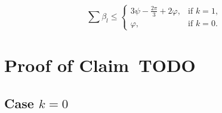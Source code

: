 
\begin{claim}
$$\sum{\beta_l}\leq\begin{cases}3\psi - \frac{2\pi}{3} + 2\varphi, & \textrm{if }k = 1, \\ \varphi, & \textrm{if }k = 0.\end{cases}$$
\end{claim}

\section{Proof of Claim~TODO}

\subsection{Case $k = 0$}

